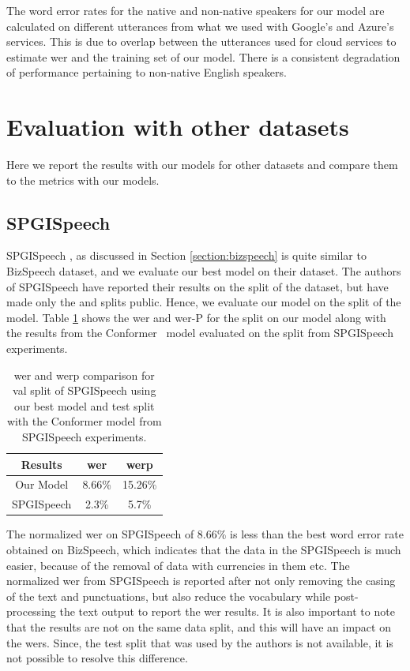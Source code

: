 The word error rates for the native and non-native speakers for our model are calculated on different utterances from what we used with Google's and Azure's services. This is due to overlap between the utterances used for cloud services to estimate \acrshort{wer} and the training set of our model. There is a consistent degradation of performance pertaining to non-native English speakers.


\section{Evaluation with other datasets}
Here we report the results with our models for other datasets and compare them to the metrics with our models. 
\subsection{SPGISpeech}
SPGISpeech \cite{Oneill2021SPGISpeech:Recognition}, as discussed in Section \ref{section:bizspeech} is quite similar to BizSpeech dataset, and we evaluate our best model on their dataset. The authors of SPGISpeech have reported their results on the  split of the dataset, but have made only the  and  splits public. Hence, we evaluate our model on the  split of the model. Table \ref{table:spgi} shows the \acrshort{wer} and \acrshort{wer}-P for the  split on our model along with the results from the Conformer \cite{Gulati2020Conformer:Recognition} \ model evaluated on the  split from SPGISpeech experiments.
\begin{table}[ht]
\centering
\begin{tabular}{c | c c  }
\hline
\textbf{Results} & \acrshort{wer} & \acrshort{werp} \\
 \hline
  Our Model & 8.66\% & 15.26\% \\
  SPGISpeech \cite{Oneill2021SPGISpeech:Recognition} & 2.3\% & 5.7\% \\
 \hline
\end{tabular}
\caption{\label{table:spgi} \acrshort{wer} and \acrshort{werp} comparison for val split of SPGISpeech using our best model and test split with the Conformer model from SPGISpeech experiments.}
\end{table}

The normalized \acrshort{wer} on SPGISpeech of 8.66\% is less than the best word error rate obtained on BizSpeech, which indicates that the data in the SPGISpeech is much easier, because of the removal of data with currencies in them etc. The normalized \acrshort{wer} from SPGISpeech is reported after not only removing the casing of the text and punctuations, but also reduce the vocabulary while post-processing the text output to report the \acrshort{wer} results.  It is also important to note that the results are not on the same data split, and this will have an impact on the \acrshort{wer}s. Since, the test split that was used by the authors is not available, it is not possible to resolve this difference.

